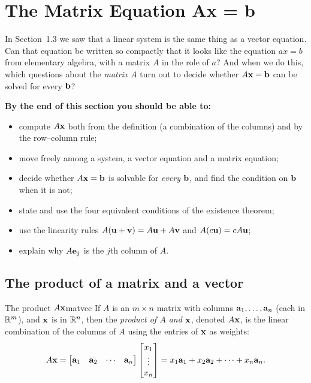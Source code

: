 \documentclass[11pt]{article}
\begin{document}
 
\section{The Matrix Equation Ax = b}
 
\begin{guide}
In Section~1.3 we saw that a linear system is the same thing as a vector equation. Can that equation be written so
compactly that it looks like the equation $ax=b$ from elementary algebra, with a matrix $A$ in the role of $a$? And when we
do this, which questions about the \emph{matrix} $A$ turn out to decide whether $A\mathbf{x}=\mathbf{b}$ can be solved for every $\mathbf{b}$?
\end{guide}
 
\textbf{By the end of this section you should be able to:}
\begin{itemize}
  \item compute $A\mathbf{x}$ both from the definition (a combination of the columns) and by the row--column rule;
  \item move freely among a system, a vector equation and a matrix equation;
  \item decide whether $A\mathbf{x}=\mathbf{b}$ is solvable for \emph{every} $\mathbf{b}$, and find the condition on $\mathbf{b}$ when it is not;
  \item state and use the four equivalent conditions of the existence theorem;
  \item use the linearity rules $A(\mathbf{u}+\mathbf{v})=A\mathbf{u}+A\mathbf{v}$ and $A(c\mathbf{u})=cA\mathbf{u}$;
  \item explain why $A\mathbf{e}_j$ is the $j$th column of $A$.
\end{itemize}
 
\subsection*{The product of a matrix and a vector}
 
\begin{defn}{The product $A\mathbf{x}$}{matvec}
If $A$ is an $m\times n$ matrix with columns $\mathbf{a}_1,\dots,\mathbf{a}_n$ (each in $\mathbb{R}^m$), and $\mathbf{x}$ is in $\mathbb{R}^n$, then
the \emph{product of $A$ and $\mathbf{x}$}, denoted $A\mathbf{x}$, is the linear combination of the columns of $A$ using the entries of
$\mathbf{x}$ as weights:
\[
A\mathbf{x}=\begin{bmatrix}\mathbf{a}_1&\mathbf{a}_2&\cdots&\mathbf{a}_n\end{bmatrix}\begin{bmatrix}x_1\\ \vdots\\ x_n\end{bmatrix}
=x_1\mathbf{a}_1+x_2\mathbf{a}_2+\cdots+x_n\mathbf{a}_n.
\]
\end{defn}
 
\end{document}
